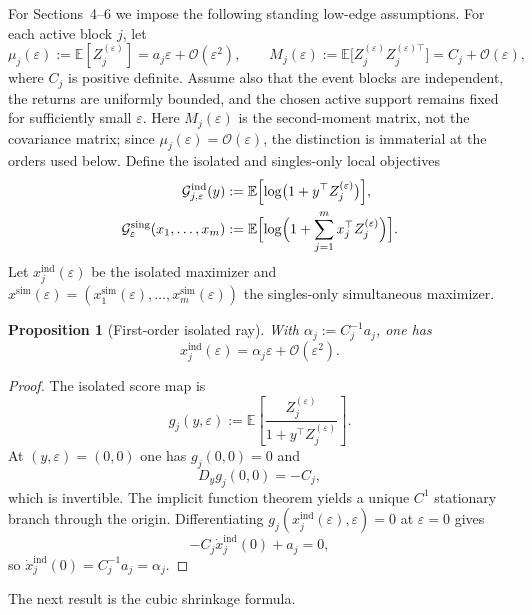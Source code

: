 \documentclass[11pt]{article}
\numberwithin{equation}{section}
\newtheorem{proposition}[theorem]{Proposition}
\theoremstyle{remark}
\theoremstyle{definition}
\newcommand{\E}{\mathbb{E}}
\newcommand{\1}{\mathbf{1}}
\newcommand{\OO}{\mathcal{O}}
\newcommand{\eps}{\varepsilon}
\newcommand{\ind}{\mathrm{ind}}
\newcommand{\simu}{\mathrm{sim}}
\newcommand{\sing}{\mathrm{sing}}
\begin{document}
For Sections~4--6 we impose the following standing low-edge assumptions. For each active block $j$, let
\begin{equation}
  \mu_j(\eps):=\E[Z_j^{(\eps)}]=a_j\eps+\OO(\eps^2),
  \qquad
  M_j(\eps):=\E\bigl[Z_j^{(\eps)}Z_j^{(\eps)\top}\bigr]=C_j+\OO(\eps),
  \label{eq:mu-C}
\end{equation}
where $C_j$ is positive definite. Assume also that the event blocks are independent, the returns are uniformly bounded, and the chosen active support remains fixed for sufficiently small $\eps$. Here $M_j(\eps)$ is the second-moment matrix, not the covariance matrix; since $\mu_j(\eps)=\OO(\eps)$, the distinction is immaterial at the orders used below. Define the isolated and singles-only local objectives
\begin{align}
  \mathcal G_{j,\eps}^{\ind}(y)
    &:= \E\Bigl[\log\bigl(1+y^\top Z_j^{(\eps)}\bigr)\Bigr],
    \label{eq:Gind}\\
  \mathcal G_{\eps}^{\sing}(x_1,\dots,x_m)
    &:= \E\Bigl[\log\Bigl(1+\sum_{j=1}^m x_j^\top Z_j^{(\eps)}\Bigr)\Bigr].
    \label{eq:Gsim}
\end{align}
Let $x_j^{\ind}(\eps)$ be the isolated maximizer and $x^{\simu}(\eps)=(x_1^{\simu}(\eps),\dots,x_m^{\simu}(\eps))$ the singles-only simultaneous maximizer.

\begin{proposition}[First-order isolated ray]
\label{prop:first-order-ray}
With $\alpha_j:=C_j^{-1}a_j$, one has
\begin{equation}
  x_j^{\ind}(\eps)=\alpha_j\eps+\OO(\eps^2).
  \label{eq:first-order-ray}
\end{equation}
\end{proposition}

\begin{proof}
The isolated score map is
\[
  g_j(y,\eps):=\E\!\left[\frac{Z_j^{(\eps)}}{1+y^\top Z_j^{(\eps)}}\right].
\]
At $(y,\eps)=(0,0)$ one has $g_j(0,0)=0$ and
\[
  D_y g_j(0,0)=-C_j,
\]
which is invertible. The implicit function theorem yields a unique $C^1$ stationary branch through the origin. Differentiating $g_j(x_j^{\ind}(\eps),\eps)=0$ at $\eps=0$ gives
\[
  -C_j\dot x_j^{\ind}(0)+a_j=0,
\]
so $\dot x_j^{\ind}(0)=C_j^{-1}a_j=\alpha_j$.
\end{proof}

The next result is the cubic shrinkage formula.
\end{document}
